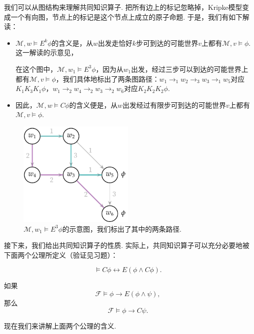 我们可以从图结构来理解共同知识算子. 把所有边上的标记忽略掉，Kripke模型变成一个有向图，节点上的标记是这个节点上成立的原子命题. 于是，我们有如下解读：
\begin{itemize}
    \item $\mathcal M,w\vDash E^k\phi$的含义是，从$w$出发走恰好$k$步可到达的可能世界$v$上都有$\mathcal M,v\vDash \phi$. 这一解读的示意见，
    
    在这个图中，$\mathcal M,w_1\vDash E^3\phi$，因为从$w_1$出发，经过三步可以到达的可能世界上都有$\mathcal M,v\vDash \phi$，我们具体地标出了两条图路径：$w_1\to_1 w_2\to_3 w_3\to_1 w_5$对应$K_1K_3K_1\phi$，$w_1\to_2 w_4\to_2 w_3\to_2 w_6$对应$K_2K_2K_2\phi$.
    \item 因此，$\mathcal M,w\vDash C\phi$的含义便是，从$w$出发经过有限步可到达的可能世界$v$上都有$\mathcal M,v\vDash \phi$.
\end{itemize}
\begin{figure}[ht]
    \centering
    \includegraphics[width=0.5\textwidth]{figures/modal-logic/Ek-illustration.pdf}
    \caption{$\mathcal M,w_1\vDash E^3\phi$的示意图，我们标出了其中的两条路径.} \label{fig:Ek-illustration}
\end{figure}

接下来，我们给出共同知识算子的性质. 实际上，共同知识算子可以充分必要地被下面两个公理所定义（验证见习题）：

\begin{proposition}[不动点公理]
\[\vDash C\phi\leftrightarrow E(\phi\wedge C\phi).\]
\end{proposition}

\begin{proposition}[归纳规则]
如果
\[\mathcal F\vDash \phi\to E(\phi\wedge\psi),\]
那么 
\[\mathcal  F\vDash \phi\to C\psi.\]
\end{proposition}

现在我们来讲解上面两个公理的含义. 

